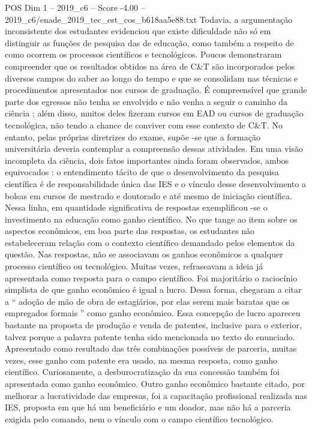 \begin{textsample}{POS Dim 1 – 2019\_c6 – Score -4.00 – 2019\_c6/enade\_2019\_tec\_est\_cos\_b618aa5e88.txt}
Todavia, a argumentação inconsistente dos estudantes evidenciou que existe dificuldade não só em distinguir as funções de pesquisa das de educação, como também a respeito de como ocorrem os processos científicos e tecnológicos.
Poucos demonstraram compreender que os resultados obtidos na área de C\&T são incorporados pelos diversos campos do saber ao longo do tempo e que se consolidam nas técnicas e procedimentos apresentados nos cursos de graduação.
É compreensível que grande parte dos egressos não tenha se envolvido e não venha a seguir o caminho da ciência ; além disso, muitos deles fizeram cursos em EAD ou cursos de graduação tecnológica, não tendo a chance de conviver com esse contexto de C\&T.
No entanto, pelas próprias diretrizes do exame, supõe -se que a formação universitária deveria contemplar a compreensão dessas atividades.
Em uma visão incompleta da ciência, dois fatos importantes ainda foram observados, ambos equivocados : o entendimento tácito de que o desenvolvimento da pesquisa científica é de responsabilidade única das IES e o vínculo desse desenvolvimento a bolsas em cursos de mestrado e doutorado e até mesmo de iniciação científica.
Nessa linha, em quantidade significativa de respostas exemplificou -se o investimento na educação como ganho científico.
No que tange ao item sobre os aspectos econômicos, em boa parte das respostas, os estudantes não estabeleceram relação com o contexto científico demandado pelos elementos da questão.
Nas respostas, não se associavam os ganhos econômicos a qualquer processo científico ou tecnológico.
Muitas vezes, refraseavam a ideia já apresentada como resposta para o campo científico.
Foi majoritário o raciocínio simplista de que ganho econômico é igual a lucro.
Dessa forma, chegaram a citar a “ adoção de mão de obra de estagiários, por elas serem mais baratas que os empregados formais ” como ganho econômico.
Essa concepção de lucro apareceu bastante na proposta de produção e venda de patentes, inclusive para o exterior, talvez porque a palavra patente tenha sido mencionada no texto do enunciado.
Apresentado como resultado das três combinações possíveis de parceria, muitas vezes, esse ganho com patente era usado, na mesma resposta, como ganho científico.
Curiosamente, a desburocratização da sua concessão também foi apresentada como ganho econômico.
Outro ganho econômico bastante citado, por melhorar a lucratividade das empresas, foi a capacitação profissional realizada nas IES, proposta em que há um beneficiário e um doador, mas não há a parceria exigida pelo comando, nem o vínculo com o campo científico tecnológico.

\end{textsample}
